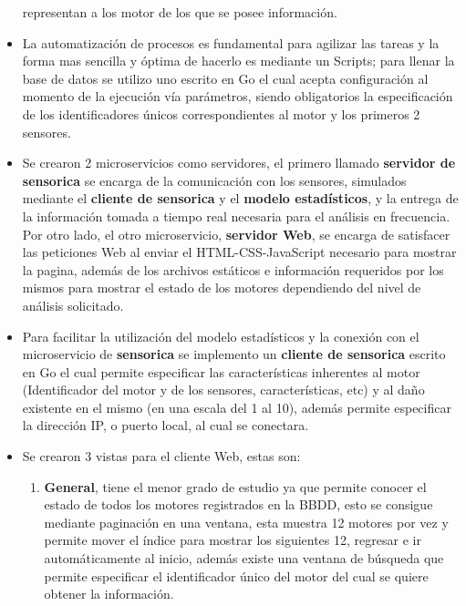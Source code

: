 \begin{itemize}
        representan a los motor de los que se posee información.
    \item La automatización de procesos es fundamental para agilizar las tareas y
        la forma mas sencilla y óptima de hacerlo es mediante un Scripts; para
        llenar la base de datos se utilizo uno escrito en Go el cual acepta
        configuración al momento de la ejecución vía parámetros, siendo obligatorios
        la especificación de los identificadores únicos correspondientes al motor
        y los primeros 2 sensores.
    \item Se crearon 2 microservicios como servidores, el primero llamado
        \textbf{servidor de sensorica}
        se encarga de la comunicación con los sensores, simulados mediante el
        \textbf{cliente de sensorica} y el \textbf{modelo estadísticos}, y la
        entrega de la información tomada a tiempo real necesaria para el análisis
        en frecuencia. Por otro lado, el otro microservicio, \textbf{servidor Web},
        se encarga de satisfacer las peticiones Web al enviar el HTML-CSS-JavaScript
        necesario para mostrar la pagina, además de los archivos estáticos e
        información requeridos por los mismos para mostrar el estado de los motores
        dependiendo del nivel de análisis solicitado.
    \item Para facilitar la utilización del modelo estadísticos y la conexión con
        el microservicio de \textbf{sensorica} se implemento un \textbf{cliente de
        sensorica} escrito en Go el cual permite especificar las características
        inherentes al motor (Identificador del motor y de los sensores, características, etc)
        y al daño existente en el mismo (en una escala del 1 al 10), además permite
        especificar la dirección IP, o puerto local, al cual se conectara.
    \item Se crearon 3 vistas para el cliente Web, estas son:
        \begin{enumerate}
            \item \textbf{General},
                tiene el menor grado de estudio ya que permite conocer el estado de todos
                los motores registrados en la BBDD, esto se consigue mediante paginación
                en una ventana, esta muestra 12 motores por vez y permite mover el índice
                para mostrar los siguientes 12, regresar e ir automáticamente al inicio,
                además existe una ventana de búsqueda que permite especificar el identificador
                único del motor del cual se quiere obtener la información.

\end{enumerate}
\end{itemize}
